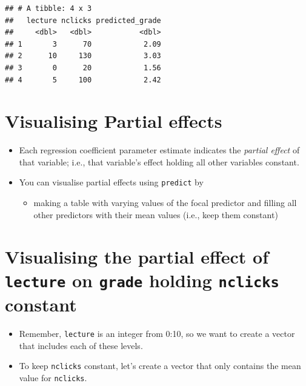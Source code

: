 \documentclass[
]{article}
\providecommand{\tightlist}{%
  \setlength{\itemsep}{0pt}\setlength{\parskip}{0pt}}
\begin{document}
\begin{verbatim}
## # A tibble: 4 x 3
##   lecture nclicks predicted_grade
##     <dbl>   <dbl>           <dbl>
## 1       3      70            2.09
## 2      10     130            3.03
## 3       0      20            1.56
## 4       5     100            2.42
\end{verbatim}

\hypertarget{visualising-partial-effects}{%
\section{Visualising Partial
effects}\label{visualising-partial-effects}}

\begin{itemize}
\tightlist
\item
  Each regression coefficient parameter estimate indicates the
  \emph{partial effect} of that variable; i.e., that variable's effect
  holding all other variables constant.
\item
  You can visualise partial effects using \texttt{predict} by

  \begin{itemize}
  \tightlist
  \item
    making a table with varying values of the focal predictor and
    filling all other predictors with their mean values (i.e., keep them
    constant)
  \end{itemize}
\end{itemize}

\hypertarget{visualising-the-partial-effect-of-lecture-on-grade-holding-nclicks-constant}{%
\section{\texorpdfstring{Visualising the partial effect of
\texttt{lecture} on \texttt{grade} holding \texttt{nclicks}
constant}{Visualising the partial effect of lecture on grade holding nclicks constant}}\label{visualising-the-partial-effect-of-lecture-on-grade-holding-nclicks-constant}}

\begin{itemize}
\tightlist
\item
  Remember, \texttt{lecture} is an integer from 0:10, so we want to
  create a vector that includes each of these levels.
\item
  To keep \texttt{nclicks} constant, let's create a vector that only
  contains the mean value for \texttt{nclicks}.
\end{itemize}
\end{document}
